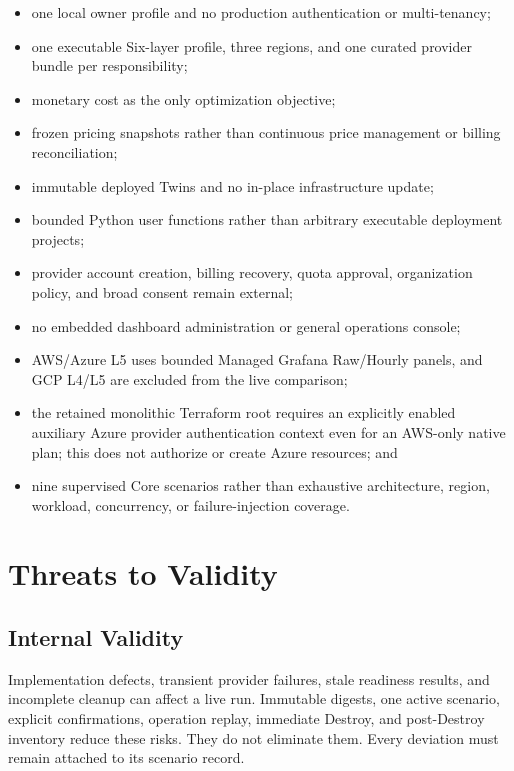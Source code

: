 \begin{itemize}
    \item one local owner profile and no production authentication or
    multi-tenancy;
    \item one executable Six-layer profile, three regions, and one curated
    provider bundle per responsibility;
    \item monetary cost as the only optimization objective;
    \item frozen pricing snapshots rather than continuous price management or
    billing reconciliation;
    \item immutable deployed Twins and no in-place infrastructure update;
    \item bounded Python user functions rather than arbitrary executable
    deployment projects;
    \item provider account creation, billing recovery, quota approval,
    organization policy, and broad consent remain external;
    \item no embedded dashboard administration or general operations console;
    \item AWS/Azure L5 uses bounded Managed Grafana Raw/Hourly panels, and
    GCP L4/L5 are excluded from the live comparison;
    \item the retained monolithic Terraform root requires an explicitly enabled
    auxiliary Azure provider authentication context even for an AWS-only native
    plan; this does not authorize or create Azure resources; and
    \item nine supervised Core scenarios rather than exhaustive architecture,
    region, workload, concurrency, or failure-injection coverage.
\end{itemize}

\section{Threats to Validity}

\subsection{Internal Validity}

Implementation defects, transient provider failures, stale readiness results,
and incomplete cleanup can affect a live run. Immutable digests, one active
scenario, explicit confirmations, operation replay, immediate Destroy, and
post-Destroy inventory reduce these risks. They do not eliminate them. Every
deviation must remain attached to its scenario record.

